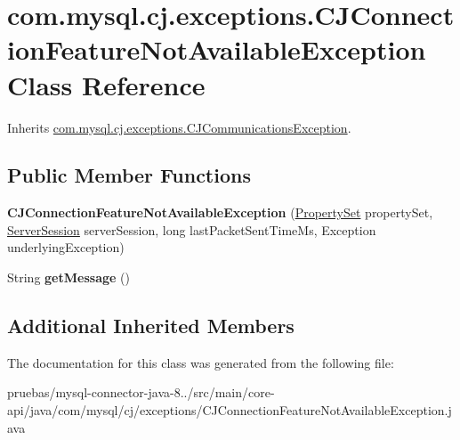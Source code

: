 \hypertarget{classcom_1_1mysql_1_1cj_1_1exceptions_1_1_c_j_connection_feature_not_available_exception}{}\section{com.\+mysql.\+cj.\+exceptions.\+C\+J\+Connection\+Feature\+Not\+Available\+Exception Class Reference}
\label{classcom_1_1mysql_1_1cj_1_1exceptions_1_1_c_j_connection_feature_not_available_exception}


Inherits \mbox{\hyperlink{classcom_1_1mysql_1_1cj_1_1exceptions_1_1_c_j_communications_exception}{com.\+mysql.\+cj.\+exceptions.\+C\+J\+Communications\+Exception}}.

\subsection*{Public Member Functions}
\begin{DoxyCompactItemize}
\item 
\mbox{\label{classcom_1_1mysql_1_1cj_1_1exceptions_1_1_c_j_connection_feature_not_available_exception_a38bd9b47e94da5285884a4b062f6731a}} 
{\bfseries C\+J\+Connection\+Feature\+Not\+Available\+Exception} (\mbox{\hyperlink{interfacecom_1_1mysql_1_1cj_1_1conf_1_1_property_set}{Property\+Set}} property\+Set, \mbox{\hyperlink{interfacecom_1_1mysql_1_1cj_1_1protocol_1_1_server_session}{Server\+Session}} server\+Session, long last\+Packet\+Sent\+Time\+Ms, Exception underlying\+Exception)
\item 
\mbox{\label{classcom_1_1mysql_1_1cj_1_1exceptions_1_1_c_j_connection_feature_not_available_exception_a9e98c1e92dcc3ff64199f23d3b68755c}} 
String {\bfseries get\+Message} ()
\end{DoxyCompactItemize}
\subsection*{Additional Inherited Members}


The documentation for this class was generated from the following file\+:\begin{DoxyCompactItemize}
\item 
pruebas/mysql-\/connector-\/java-\/8../src/main/core-\/api/java/com/mysql/cj/exceptions/C\+J\+Connection\+Feature\+Not\+Available\+Exception.\+java\end{DoxyCompactItemize}
